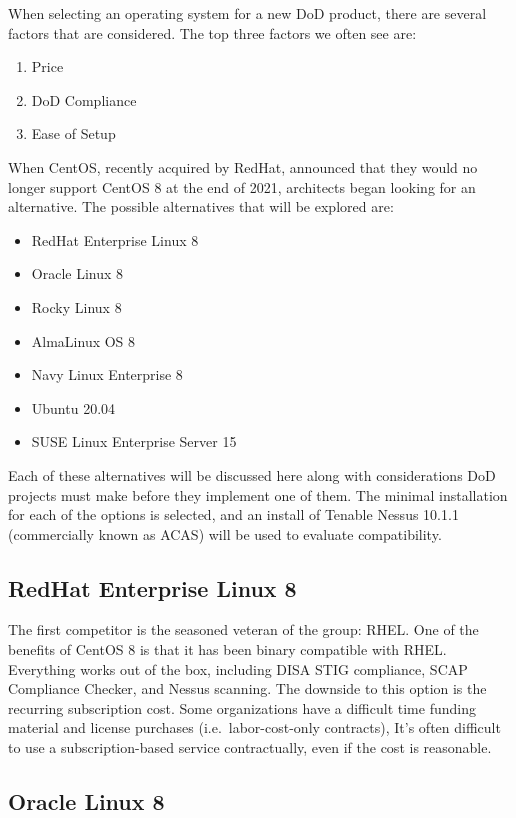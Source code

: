 When selecting an operating system for a new DoD product, there are several factors that are considered. The top three factors we often see are:
\begin{enumerate}
	\item Price
	\item DoD Compliance
	\item Ease of Setup
\end{enumerate}

When CentOS, recently acquired by RedHat, announced that they would no longer support CentOS 8 at the end of 2021,\autocite{20220321:centos-eol} architects began looking for an alternative. The possible alternatives that will be explored are:
\begin{itemize}
	\item RedHat Enterprise Linux 8
	\item Oracle Linux 8
	\item Rocky Linux 8
	\item AlmaLinux OS 8
	\item Navy Linux Enterprise 8
	\item Ubuntu 20.04
	\item SUSE Linux Enterprise Server 15
\end{itemize}

Each of these alternatives will be discussed here along with considerations DoD projects must make before they implement one of them. The minimal installation for each of the options is selected, and an install of Tenable Nessus 10.1.1 (commercially known as ACAS) will be used to evaluate compatibility.

\subsection{RedHat Enterprise Linux 8}

The first competitor is the seasoned veteran of the group: RHEL. One of the benefits of CentOS 8 is that it has been binary compatible with RHEL. Everything works out of the box, including DISA STIG compliance, SCAP Compliance Checker, and Nessus scanning. The downside to this option is the recurring subscription cost. Some organizations have a difficult time funding material and license purchases (i.e.\ labor-cost-only contracts), It's often difficult to use a subscription-based service contractually, even if the cost is reasonable.

\subsection{Oracle Linux 8}

